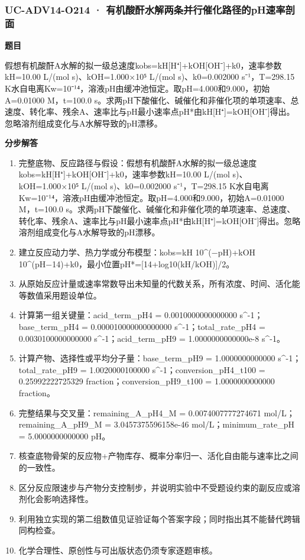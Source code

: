 \documentclass[UTF8,11pt,a4paper]{ctexart}
\begin{document}
\subsubsection*{UC-ADV14-O214 · 有机酸酐水解两条并行催化路径的pH速率剖面}
\noindent\textbf{题目}\par
假想有机酸酐A水解的拟一级总速度kobs=kH[H⁺]+kOH[OH⁻]+k0，速率参数kH=10.00 L/(mol s)、kOH=1.000×10⁵ L/(mol s)、k0=0.002000 s⁻¹，T=298.15 K水自电离Kw=10⁻¹⁴，溶液pH由缓冲池恒定。取pH=4.000和9.000，初始A=0.01000 M，t=100.0 s。求两pH下酸催化、碱催化和非催化项的单项速率、总速度、转化率、残余A、速率比与pH最小速率点pH*由kH[H⁺]=kOH[OH⁻]得出。忽略溶剂组成变化与A水解导致的pH漂移。\par
\medskip\noindent\textbf{分步解答}
\begin{enumerate}
\item 完整底物、反应路径与假设：假想有机酸酐A水解的拟一级总速度kobs=kH[H⁺]+kOH[OH⁻]+k0，速率参数kH=10.00 L/(mol s)、kOH=1.000×10⁵ L/(mol s)、k0=0.002000 s⁻¹，T=298.15 K水自电离Kw=10⁻¹⁴，溶液pH由缓冲池恒定。取pH=4.000和9.000，初始A=0.01000 M，t=100.0 s。求两pH下酸催化、碱催化和非催化项的单项速率、总速度、转化率、残余A、速率比与pH最小速率点pH*由kH[H⁺]=kOH[OH⁻]得出。忽略溶剂组成变化与A水解导致的pH漂移。
\item 建立反应动力学、热力学或分布模型：kobs=kH 10\textasciicircum{}(−pH)+kOH 10\textasciicircum{}(pH−14)+k0，最小位置pH*=[14+log10(kH/kOH)]/2。
\item 从原始反应计量或速率常数导出未知量的代数关系，所有浓度、时间、活化能等数值采用题设单位。
\item 计算第一组关键量：acid\_term\_pH4 = 0.0010000000000000 s\textasciicircum{}-1；base\_term\_pH4 = 0.000010000000000000 s\textasciicircum{}-1；total\_rate\_pH4 = 0.0030100000000000 s\textasciicircum{}-1；acid\_term\_pH9 = 1.0000000000000e-8 s\textasciicircum{}-1。
\item 计算产物、选择性或平均分子量：base\_term\_pH9 = 1.0000000000000 s\textasciicircum{}-1；total\_rate\_pH9 = 1.0020000100000 s\textasciicircum{}-1；conversion\_pH4\_t100 = 0.25992222725329 fraction；conversion\_pH9\_t100 = 1.0000000000000 fraction。
\item 完整结果与交叉量：remaining\_A\_pH4\_M = 0.0074007777274671 mol/L；remaining\_A\_pH9\_M = 3.0457375596158e-46 mol/L；minimum\_rate\_pH = 5.0000000000000 pH。
\item 核查底物骨架的反应物+产物库存、概率分率归一、活化自由能与速率比之间的一致性。
\item 区分反应限速步与产物分支控制步，并说明实验中不受题设约束的副反应或溶剂化会影响选择性。
\item 利用独立实现的第二组数值见证验证每个答案字段；同时指出其不能替代跨辑同构检查。
\item 化学合理性、原创性与可出版状态仍须专家逐题审核。
\end{enumerate}
\end{document}
